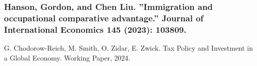 \documentclass{article}
\begin{document}
\subsubsection{Hanson, Gordon, and Chen Liu. ”Immigration and occupational comparative advantage.”
Journal of International Economics 145 (2023): 103809.}




\begin{thebibliography}{9}

G. Chodorow-Reich, M. Smith, O. Zidar, E. Zwick. Tax Policy and Investment in a Global Economy. Working Paper, 2024.

\end{thebibliography}
\end{document}
